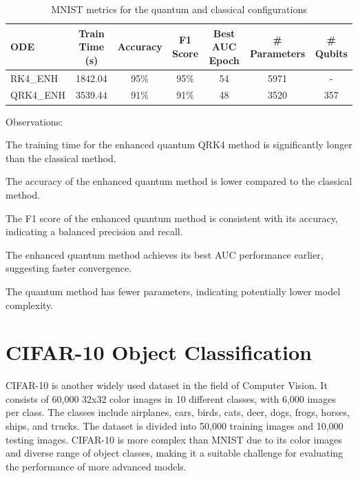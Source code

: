 \documentclass[12pt,a4paper]{report}
\begin{document}
\clearpage

\begin{table}[th]\small\linespread{1}
  \label{tab:hybrid_MNIST}
  \centering
  \begin{tabular}{|l|c|c|c|c|c|c|}
    \hline
    \textbf{ODE} & \textbf{Train Time (s)} & \textbf{Accuracy} & \textbf{F1 Score} & \textbf{Best AUC Epoch} & \textbf{\# Parameters} & \textbf{\# Qubits} \\
    \hline
    RK4\_ENH     & 1842.04                 & 95\%              & 95\%              & 54                      & 5971                   & -                  \\
    QRK4\_ENH    & 3539.44                 & 91\%              & 91\%              & 48                      & 3520                   & 357                \\
    \hline
  \end{tabular}
  \caption{MNIST metrics for the quantum and classical configurations}
\end{table}

Observations:

The training time for the enhanced quantum QRK4 method is significantly longer than the classical method.

The accuracy of the enhanced quantum method is lower compared to the classical method.

The F1 score of the enhanced quantum method is consistent with its accuracy, indicating a balanced precision and recall.

The enhanced quantum method achieves its best AUC performance earlier, suggesting faster convergence.

The quantum method has fewer parameters, indicating potentially lower model complexity.

\clearpage

\section{CIFAR-10 Object Classification}

CIFAR-10 is another widely used dataset in the field of Computer Vision. It consists of 60,000 32x32 color images in 10 different classes, with 6,000 images per class. The classes include airplanes, cars, birds, cats, deer, dogs, frogs, horses, ships, and trucks. The dataset is divided into 50,000 training images and 10,000 testing images. CIFAR-10 is more complex than MNIST due to its color images and diverse range of object classes, making it a suitable challenge for evaluating the performance of more advanced models.
\end{document}
